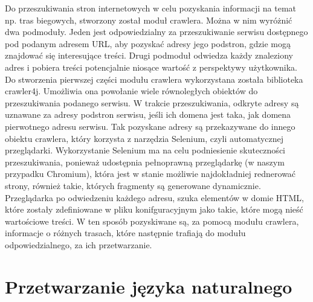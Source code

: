 \documentclass[titlepage]{article}
\begin{document}
Do przeszukiwania stron internetowych w celu pozyskania informacji na temat np. tras biegowych, stworzony został moduł crawlera. Można w nim wyróżnić dwa podmoduły. Jeden jest odpowiedzialny za przeszukiwanie serwisu dostępnego pod podanym adresem URL, aby pozyskać adresy jego podstron, gdzie mogą znajdować się interesujące treści. Drugi podmoduł odwiedza każdy znaleziony adres i pobiera treści potencjalnie niosące wartość z perspektywy użytkownika. Do stworzenia pierwszej części modułu crawlera wykorzystana została biblioteka crawler4j. Umożliwia ona powołanie wiele równoległych obiektów do przeszukiwania podanego serwisu. W trakcie przeszukiwania, odkryte adresy są uznawane za adresy podstron serwisu, jeśli ich domena jest taka, jak domena pierwotnego adresu serwisu. Tak pozyskane adresy są przekazywane do innego obiektu crawlera, który korzysta z narzędzia Selenium, czyli automatycznej przeglądarki. Wykorzystanie Selenium ma na celu podniesienie skuteczności przeszukiwania, ponieważ udostępnia pełnoprawną przeglądarkę (w naszym przypadku Chromium), która jest w stanie możliwie najdokładniej rednerować strony, również takie, których fragmenty są generowane dynamicznie. Przeglądarka po odwiedzeniu każdego adresu, szuka elementów w domie HTML, które zostały zdefiniowane w pliku konifguracyjnym jako takie, które mogą nieść wartościowe treści. W ten sposób pozyskiwane są, za pomocą modułu crawlera, informacje o różnych trasach, które następnie trafiają do modułu odpowiedzialnego, za ich przetwarzanie. 

\section{Przetwarzanie języka naturalnego}
\label{sec:nlp}
\end{document}
